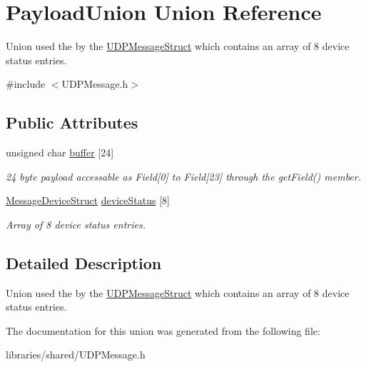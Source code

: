 \hypertarget{union_payload_union}{}\section{Payload\+Union Union Reference}
\label{union_payload_union}


Union used the by the \hyperlink{struct_u_d_p_message_struct}{U\+D\+P\+Message\+Struct} which contains an array of 8 device status entries.  




{\ttfamily \#include $<$U\+D\+P\+Message.\+h$>$}

\subsection*{Public Attributes}
\begin{DoxyCompactItemize}
\item 
\mbox{\label{union_payload_union_acd95e9d47504ae508bd341cb0383222c}} 
unsigned char \hyperlink{union_payload_union_acd95e9d47504ae508bd341cb0383222c}{buffer} \mbox{[}24\mbox{]}
\begin{DoxyCompactList}\small\item\em 24 byte payload accessable as Field\mbox{[}0\mbox{]} to Field\mbox{[}23\mbox{]} through the get\+Field() member. \end{DoxyCompactList}\item 
\mbox{\label{union_payload_union_a4f1c0490a4e4dd5136936f432772873f}} 
\hyperlink{struct_message_device_struct}{Message\+Device\+Struct} \hyperlink{union_payload_union_a4f1c0490a4e4dd5136936f432772873f}{device\+Status} \mbox{[}8\mbox{]}
\begin{DoxyCompactList}\small\item\em Array of 8 device status entries. \end{DoxyCompactList}\end{DoxyCompactItemize}


\subsection{Detailed Description}
Union used the by the \hyperlink{struct_u_d_p_message_struct}{U\+D\+P\+Message\+Struct} which contains an array of 8 device status entries. 

The documentation for this union was generated from the following file\+:\begin{DoxyCompactItemize}
\item 
libraries/shared/U\+D\+P\+Message.\+h\end{DoxyCompactItemize}
